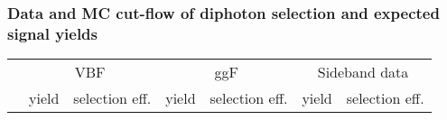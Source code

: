 \subsubsection{Data and MC cut-flow of diphoton selection and expected signal yields}
\label{ssec:inclusive_cut_flow}


\begin{table}[htbp]
\begin{center}
\begin{tabular}{l|cccccc}
\hline
                     & \multicolumn{2}{c}{VBF}    & \multicolumn{2}{c}{ggF}    & \multicolumn{2}{c}{Sideband data} \\
                     & yield     & selection eff. & yield     & selection eff. & yield     & selection eff. \\ \hline

\end{tabular}
\end{center}
\end{table}
